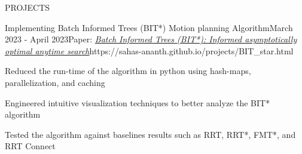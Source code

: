 \documentclass{resume} %
\begin{document}
\begin{rSection}{PROJECTS}
	\begin{rProjExpDetails}{Implementing Batch Informed Trees (BIT*) Motion planning Algorithm}{}{March 2023 - April 2023}{Paper: \href{https://journals.sagepub.com/doi/pdf/10.1177/0278364919890396}{\textit{Batch Informed Trees (BIT*): Informed asymptotically optimal anytime search}}}{https://sahas-ananth.github.io/projects/BIT_star.html}{}
		\item Reduced the run-time of the algorithm in python using hash-maps, parallelization, and caching
		\item Engineered intuitive visualization techniques to better analyze the BIT* algorithm
		\item Tested the algorithm against baselines results such as RRT, RRT*, FMT*, and RRT Connect
	\end{rProjExpDetails}

\end{rSection}
\end{document}

